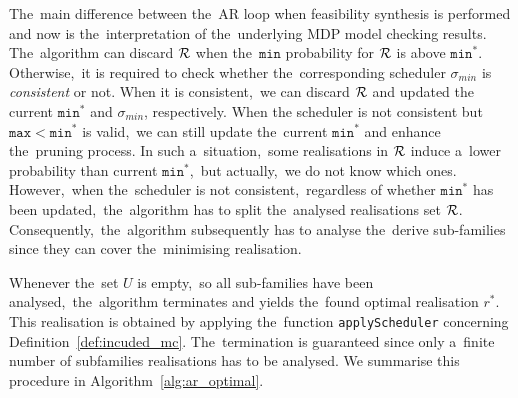 The~main difference between the~AR loop when feasibility synthesis is performed and now is the~interpretation of the~underlying MDP model checking results.
The~algorithm can discard $\mathcal{R}$ when the~$\mathtt{min}$ probability for $\mathcal{R}$ is above $\mathtt{min^*}$.
Otherwise,~it is required to check whether the~corresponding scheduler $\sigma_{min}$ is \textit{consistent} or not.
When it is consistent,~we can discard $\mathcal{R}$ and updated the current $\mathtt{min^*}$ and $\sigma_{min}$, respectively.
When the scheduler is not consistent but $\mathtt{max < min^*}$ is valid,~we can still update the~current $\mathtt{min^*}$ and enhance the~pruning process.
In such a~situation,~some realisations in $\mathcal{R}$ induce a~lower probability than current $\mathtt{min^*}$,~but actually,~we do not know which ones.
However,~when the~scheduler is not consistent,~regardless of whether $\mathtt{min^*}$ has been updated,~the~algorithm has to split the~analysed realisations set $\mathcal{R}$.
Consequently,~the~algorithm subsequently has to analyse the~derive sub-families since they can cover the~minimising realisation.

Whenever the~set $U$ is empty,~so all sub-families have been analysed,~the~algorithm terminates and yields the~found optimal realisation $r^*$.
This realisation is obtained by applying the~function \texttt{applyScheduler} concerning Definition~\ref{def:incuded_mc}.
The~termination is guaranteed since only a~finite number of subfamilies realisations has to be analysed.
We summarise this procedure in Algorithm~\ref{alg:ar_optimal}.

